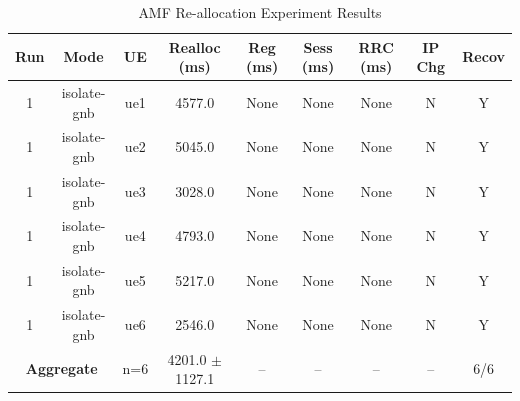 \begin{table}[ht]
\centering
\begin{tabular}{|c|c|c|c|c|c|c|c|c|}
\hline
Run & Mode & UE & Realloc (ms) & Reg (ms) & Sess (ms) & RRC (ms) & IP Chg & Recov \\
\hline
1 & isolate-gnb & ue1 & 4577.0 & None & None & None & N & Y \\
1 & isolate-gnb & ue2 & 5045.0 & None & None & None & N & Y \\
1 & isolate-gnb & ue3 & 3028.0 & None & None & None & N & Y \\
1 & isolate-gnb & ue4 & 4793.0 & None & None & None & N & Y \\
1 & isolate-gnb & ue5 & 5217.0 & None & None & None & N & Y \\
1 & isolate-gnb & ue6 & 2546.0 & None & None & None & N & Y \\
\multicolumn{2}{|c|}{\textbf{Aggregate}} & n=6 & 4201.0 $\pm$ 1127.1 & -- & -- & -- & -- & 6/6 \\
\hline
\end{tabular}
\caption{AMF Re-allocation Experiment Results}
\label{tab:amf_realloc}
\end{table}
